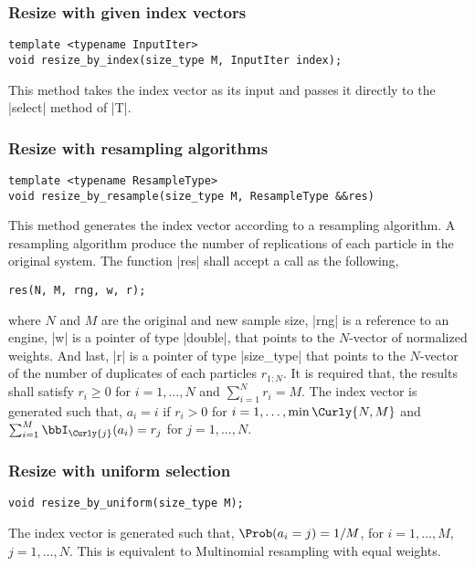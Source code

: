 \subsubsection{Resize with given index vectors}

\begin{verbatim}
template <typename InputIter>
void resize_by_index(size_type M, InputIter index);
\end{verbatim}
This method takes the index vector as its input and passes it directly to the
|select| method of |T|.

\subsubsection{Resize with resampling algorithms}

\begin{verbatim}
template <typename ResampleType>
void resize_by_resample(size_type M, ResampleType &&res)
\end{verbatim}
This method generates the index vector according to a resampling algorithm. A
resampling algorithm produce the number of replications of each particle in the
original system. The function |res| shall accept a call as the following,
\begin{verbatim}
res(N, M, rng, w, r);
\end{verbatim}
where $N$ and $M$ are the original and new sample size, |rng| is a reference to
an \rng engine, |w| is a pointer of type |double|, that points to the
$N$-vector of normalized weights. And last, |r| is a pointer of type
|size_type| that points to the $N$-vector of the number of duplicates of each
particles $r_{1:N}$. It is required that, the results shall satisfy $r_i\ge0$
for $i=1,\dots,N$ and $\sum_{i=1}^N r_i = M$. The index vector is generated
such that, $a_i = i$ if $r_i > 0$ for $i = 1,\dots,\min\Curly{N, M}$ and
$\sum_{i=1}^M\bbI_{\Curly{j}}(a_i) = r_j$ for $j = 1,\dots,N$.

\subsubsection{Resize with uniform selection}

\begin{verbatim}
void resize_by_uniform(size_type M);
\end{verbatim}
The index vector is generated such that, $\Prob(a_i = j) = 1/M$, for $i =
1,\dots,M$, $j = 1,\dots,N$. This is equivalent to Multinomial resampling with
equal weights.

